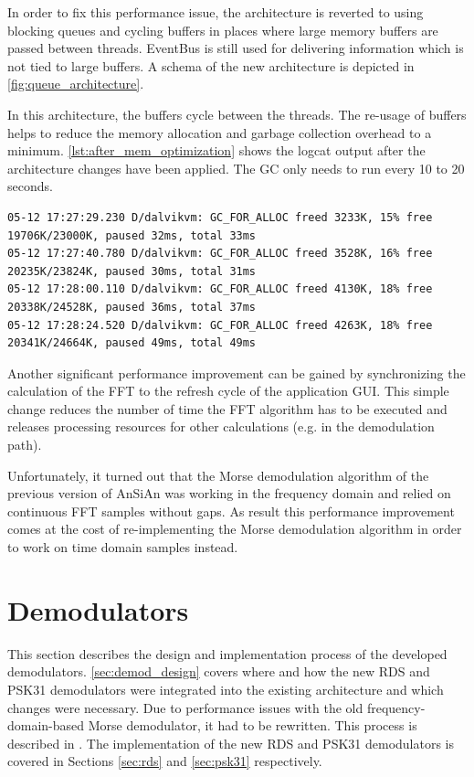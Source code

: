 In order to fix this performance issue, the architecture is reverted
to using blocking queues and cycling buffers in places where large memory buffers are passed
between threads. EventBus is still used for delivering information
which is not tied to large buffers. A schema of the new architecture
is depicted in \autoref{fig:queue_architecture}. 

In this architecture, the buffers cycle between the threads. The re-usage
of buffers helps to reduce the memory allocation and garbage collection
overhead to a minimum. \autoref{lst:after_mem_optimization} shows the
logcat output after the architecture changes have been applied. The \ac{GC}
only needs to run every 10 to 20 seconds.


\begin{lstlisting}[label=lst:after_mem_optimization, caption=Logcat output
after memory optimizations, language=none]
05-12 17:27:29.230 D/dalvikvm: GC_FOR_ALLOC freed 3233K, 15% free 19706K/23000K, paused 32ms, total 33ms
05-12 17:27:40.780 D/dalvikvm: GC_FOR_ALLOC freed 3528K, 16% free 20235K/23824K, paused 30ms, total 31ms
05-12 17:28:00.110 D/dalvikvm: GC_FOR_ALLOC freed 4130K, 18% free 20338K/24528K, paused 36ms, total 37ms
05-12 17:28:24.520 D/dalvikvm: GC_FOR_ALLOC freed 4263K, 18% free 20341K/24664K, paused 49ms, total 49ms
\end{lstlisting}

Another significant performance improvement can be gained by synchronizing
the calculation of the \ac{FFT} to the refresh cycle of the application
\ac{GUI}. This simple change reduces the number of time the \ac{FFT} algorithm
has to be executed and releases processing resources for other calculations
(e.g. in the demodulation path). 

Unfortunately, it turned out that the Morse demodulation
algorithm of the previous version of \ac{AnSiAn} was working in the frequency
domain and relied on continuous \ac{FFT} samples without gaps.
As result this performance improvement comes at the cost of re-implementing
the Morse demodulation algorithm in order to work on time domain samples
instead.


\section{Demodulators}

This section describes the design and implementation process of the developed demodulators. \autoref{sec:demod_design} covers where and how the new \ac{RDS} and \ac{PSK31} demodulators were integrated into the existing architecture and which changes were necessary. Due to performance issues with the old frequency-domain-based Morse demodulator, it had to be rewritten. This process is described in \label{sec:morse_demod}. The implementation of the new \ac{RDS} and \ac{PSK31} demodulators is covered in Sections \ref{sec:rds} and \ref{sec:psk31} respectively.



